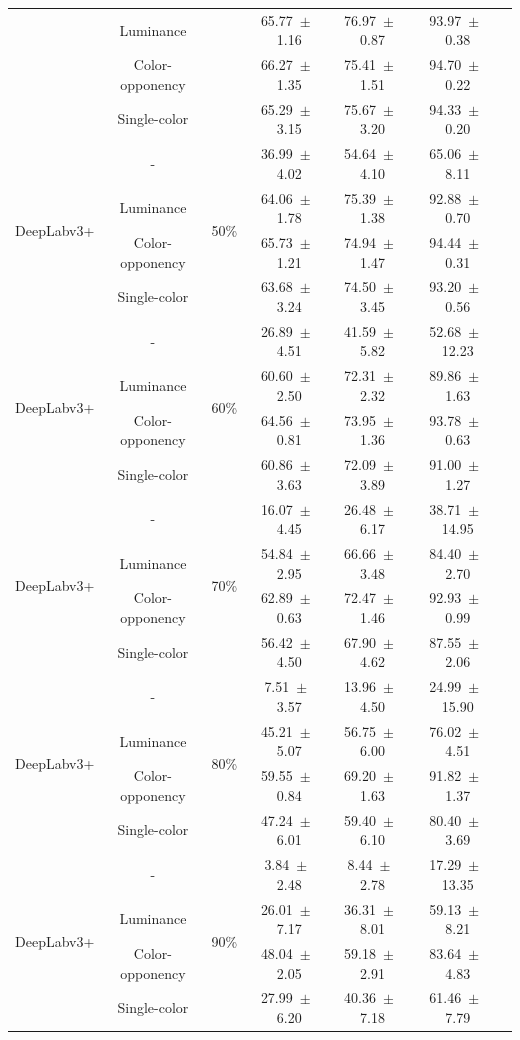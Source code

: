 \begin{table}[h]
\begin{tabular}{@{}lccc ccc@{}}
& Luminance & & 65.77~$\pm$~1.16 & 76.97~$\pm$~0.87 & 93.97~$\pm$~0.38 \\
& Color-opponency & & 66.27~$\pm$~1.35 & 75.41~$\pm$~1.51 & 94.70~$\pm$~0.22 \\
& Single-color & & 65.29~$\pm$~3.15 & 75.67~$\pm$~3.20 & 94.33~$\pm$~0.20 \\
\midrule
\multirow{4}{*}{DeepLabv3+} & - & \multirow{4}{*}{50\%} & 36.99~$\pm$~4.02 & 54.64~$\pm$~4.10 & 65.06~$\pm$~8.11 \\
& Luminance & & 64.06~$\pm$~1.78 & 75.39~$\pm$~1.38 & 92.88~$\pm$~0.70 \\
& Color-opponency & & 65.73~$\pm$~1.21 & 74.94~$\pm$~1.47 & 94.44~$\pm$~0.31 \\
& Single-color & & 63.68~$\pm$~3.24 & 74.50~$\pm$~3.45 & 93.20~$\pm$~0.56 \\
\midrule
\multirow{4}{*}{DeepLabv3+} & - & \multirow{4}{*}{60\%} & 26.89~$\pm$~4.51 & 41.59~$\pm$~5.82 & 52.68~$\pm$~12.23 \\
& Luminance & & 60.60~$\pm$~2.50 & 72.31~$\pm$~2.32 & 89.86~$\pm$~1.63 \\
& Color-opponency & & 64.56~$\pm$~0.81 & 73.95~$\pm$~1.36 & 93.78~$\pm$~0.63 \\
& Single-color & & 60.86~$\pm$~3.63 & 72.09~$\pm$~3.89 & 91.00~$\pm$~1.27 \\
\midrule
\multirow{4}{*}{DeepLabv3+} & - & \multirow{4}{*}{70\%} & 16.07~$\pm$~4.45 & 26.48~$\pm$~6.17 & 38.71~$\pm$~14.95 \\
& Luminance & & 54.84~$\pm$~2.95 & 66.66~$\pm$~3.48 & 84.40~$\pm$~2.70 \\
& Color-opponency & & 62.89~$\pm$~0.63 & 72.47~$\pm$~1.46 & 92.93~$\pm$~0.99 \\
& Single-color & & 56.42~$\pm$~4.50 & 67.90~$\pm$~4.62 & 87.55~$\pm$~2.06 \\
\midrule
\multirow{4}{*}{DeepLabv3+} & - & \multirow{4}{*}{80\%} & 7.51~$\pm$~3.57 & 13.96~$\pm$~4.50 & 24.99~$\pm$~15.90 \\
& Luminance & & 45.21~$\pm$~5.07 & 56.75~$\pm$~6.00 & 76.02~$\pm$~4.51 \\
& Color-opponency & & 59.55~$\pm$~0.84 & 69.20~$\pm$~1.63 & 91.82~$\pm$~1.37 \\
& Single-color & & 47.24~$\pm$~6.01 & 59.40~$\pm$~6.10 & 80.40~$\pm$~3.69 \\
\midrule
\multirow{4}{*}{DeepLabv3+} & - & \multirow{4}{*}{90\%} & 3.84~$\pm$~2.48 & 8.44~$\pm$~2.78 & 17.29~$\pm$~13.35 \\
& Luminance & & 26.01~$\pm$~7.17 & 36.31~$\pm$~8.01 & 59.13~$\pm$~8.21 \\
& Color-opponency & & 48.04~$\pm$~2.05 & 59.18~$\pm$~2.91 & 83.64~$\pm$~4.83 \\
& Single-color & & 27.99~$\pm$~6.20 & 40.36~$\pm$~7.18 & 61.46~$\pm$~7.79 \\
\midrule
\bottomrule
\end{tabular}
\label{tab:sparse_results_deeplabv3plus_cityscapes}
\end{table}